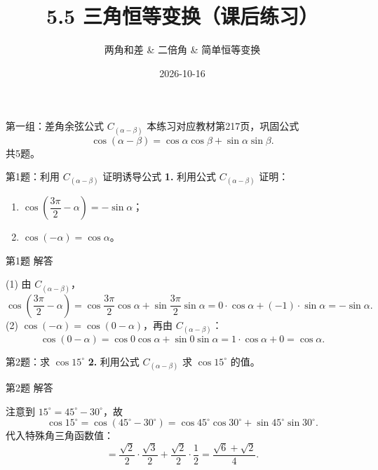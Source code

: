 \documentclass[10pt,aspectratio=169,serif]{beamer}
\title[5.5 三角恒等变换练习]{5.5 三角恒等变换（课后练习）}
\subtitle{两角和差 \& 二倍角 \& 简单恒等变换}
\author{}
\institute{}
\date{2026-10-16}
\begin{document}
\begin{frame}
  \titlepage
\end{frame}

\begin{frame}{第一组：差角余弦公式 $C_{(\alpha-\beta)}$}
本练习对应教材第217页，巩固公式
\[
\cos(\alpha-\beta)=\cos\alpha\cos\beta+\sin\alpha\sin\beta.
\]
共5题。
\end{frame}

\begin{frame}[t]{第1题：利用 $C_{(\alpha-\beta)}$ 证明诱导公式}
\textbf{1.} 利用公式 $C_{(\alpha-\beta)}$ 证明：
\begin{enumerate}
  \item $\cos\!\left(\dfrac{3\pi}{2}-\alpha\right)=-\sin\alpha$；
  \item $\cos(-\alpha)=\cos\alpha$。
\end{enumerate}
\end{frame}

\begin{frame}[t]{第1题 解答}
\begin{tcolorbox}[colback=orange!10,colframe=orange,title=\textbf{证明}]
(1) 由 $C_{(\alpha-\beta)}$，
\[
\cos\!\left(\frac{3\pi}{2}-\alpha\right)
=\cos\frac{3\pi}{2}\cos\alpha+\sin\frac{3\pi}{2}\sin\alpha
=0\cdot\cos\alpha+(-1)\cdot\sin\alpha=-\sin\alpha.
\]
(2) $\cos(-\alpha)=\cos(0-\alpha)$，再由 $C_{(\alpha-\beta)}$：
\[
\cos(0-\alpha)=\cos 0\cos\alpha+\sin 0\sin\alpha=1\cdot\cos\alpha+0=\cos\alpha.
\]
\end{tcolorbox}
\end{frame}

\begin{frame}[t]{第2题：求 $\cos 15^\circ$}
\textbf{2.} 利用公式 $C_{(\alpha-\beta)}$ 求 $\cos 15^\circ$ 的值。
\end{frame}

\begin{frame}[t]{第2题 解答}
\begin{tcolorbox}[colback=orange!10,colframe=orange,title=\textbf{解}]
注意到 $15^\circ=45^\circ-30^\circ$，故
\[
\cos 15^\circ=\cos(45^\circ-30^\circ)
=\cos45^\circ\cos30^\circ+\sin45^\circ\sin30^\circ.
\]
代入特殊角三角函数值：
\[
=\frac{\sqrt2}{2}\cdot\frac{\sqrt3}{2}+\frac{\sqrt2}{2}\cdot\frac12
=\frac{\sqrt6+\sqrt2}{4}.
\]
\end{tcolorbox}
\end{frame}
\end{document}
